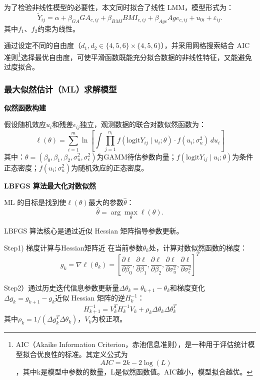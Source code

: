 为了检验非线性模型的必要性，本文同时拟合了线性 LMM，模型形式为：
\begin{equation}
\widetilde{Y}_{ij} = \alpha + \beta_{GA}GA_{c,ij} + \beta_{BMI}BMI_{c,ij} + \beta_{Age}Age_{c,ij} + u_{0i} + \varepsilon_{ij}.
\end{equation}
其中\(f_{1}\)、\(f_{2}\)约束为线性。

通过设定不同的自由度（\(d_{1},d_{2}\in\{4,5,6\}\times\{4,5,6\}\)），并采用网格搜索结合 AIC 准则\footnote{AIC（Akaike Information Criterion，赤池信息准则），是一种用于评估统计模型拟合优良性的标准。其定义公式为\[AIC = 2k - 2\log(L)\]，其中k是模型中参数的数量，L是似然函数值。AIC越小，模型拟合越优。}选择最优自由度，可使平滑函数既能充分拟合数据的非线性特征，又能避免过度拟合。

\subsubsection{最大似然估计（ML）求解模型} 

\textbf{似然函数构建}

假设随机效应\(u_i\)和残差\(\epsilon_{ij}\)独立，观测数据的联合对数似然函数为：
\begin{equation}
    \ell(\theta) = \sum_{i=1}^m \ln\left[ \int \prod_{j=1}^{n_i} f(\text{logit}Y_{ij} \mid u_i; \theta) \cdot f(u_i; \sigma_u^2) \, du_i \right]
\end{equation}
其中：\(\theta = (\beta_0, \beta_1, \beta_2, \sigma_u^2, \sigma_\epsilon^2)\)为GAMM待估参数向量；\(f(\text{logit}Y_{ij} \mid u_i; \theta)\)为条件正态密度；\(f(u_i; \sigma_u^2)\)为随机效应的正态密度。

\textbf{LBFGS 算法最大化对数似然}

ML 的目标是找到使\(\ell(\theta)\)最大的参数\(\hat{\theta}\)：
\[\hat{\theta} = \arg\max_{\theta} \ell(\theta).\]

LBFGS 算法核心是通过近似 Hessian 矩阵指导参数更新。

Step1) 梯度计算与Hessian矩阵近 在当前参数\(\theta_k\)处，计算对数似然函数的梯度：
\begin{equation}
g_k = \nabla \ell(\theta_k) = \left[ \frac{\partial \ell}{\partial \beta_0}, \frac{\partial \ell}{\partial \beta_1}, \frac{\partial \ell}{\partial \beta_2}, \frac{\partial \ell}{\partial \sigma_u^2}, \frac{\partial \ell}{\partial \sigma_\epsilon^2} \right]^T\end{equation}

Step2）通过历史迭代信息参数更新量\(\Delta \theta_k = \theta_{k+1} - \theta_k\)和梯度变化\(\Delta g_k = g_{k+1} - g_k\)近似 Hessian 矩阵的逆\(H_k^{-1}\)：
\[
    H_{k+1}^{-1} = V_k^T H_k^{-1} V_k + \rho_k \Delta \theta_k \Delta \theta_k^T
\]
其中\(\rho_k = 1/(\Delta g_k^T \Delta \theta_k)\)，\(V_k\)为校正项。

